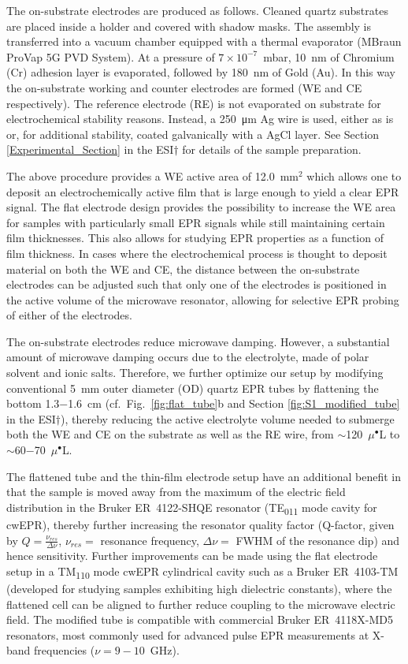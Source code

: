 \par
The on-substrate electrodes are produced as follows. Cleaned quartz substrates are placed inside a holder and covered with shadow masks. The assembly is transferred into a vacuum chamber equipped with a thermal evaporator (MBraun ProVap 5G PVD System). At a pressure of $7\times10^{-7}$~mbar, 10~nm of Chromium (Cr) adhesion layer is evaporated, followed by 180~nm of Gold (Au). In this way the on-substrate working and counter electrodes are formed (WE and CE respectively). The reference electrode (RE) is not evaporated on substrate for electrochemical stability reasons. Instead, a \SI{250}{\micro\meter} Ag wire is used, either as is or, for additional stability, coated galvanically with a AgCl layer.\cite{Safari2011} See Section \ref{Experimental_Section} in the ESI$\dag$ for details of the sample preparation.
\par
The above procedure provides a WE active area of 12.0~mm$^2$ which allows one to deposit an electrochemically active film that is large enough to yield a clear EPR signal. The flat electrode design provides the possibility to increase the WE area for samples with particularly small EPR signals while still maintaining certain film thicknesses. This also allows for studying EPR properties as a function of film thickness. In cases where the electrochemical process is thought to deposit material on both the WE and CE, the distance between the on-substrate electrodes can be adjusted such that only one of the electrodes is positioned in the active volume of the microwave resonator, allowing for selective EPR probing of either of the electrodes.
\par
The on-substrate electrodes reduce microwave damping. However, a substantial amount of microwave damping occurs due to the electrolyte, made of polar solvent and ionic salts. Therefore, we further optimize our setup by modifying conventional 5~mm outer diameter (OD) quartz EPR tubes by flattening the bottom 1.3$-$1.6~cm (cf.\ Fig.~\ref{fig:flat_tube}b and Section \ref{fig:S1_modified_tube} in the ESI$\dag$), thereby reducing the active electrolyte volume needed to submerge both the WE and CE on the substrate as well as the RE wire, from $\sim$120~$\mu^{\bullet}$L to $\sim$60$-$70~$\mu^{\bullet}$L.
\par
The flattened tube and the thin-film electrode setup have an additional benefit in that the sample is moved away from the maximum of the electric field distribution in the Bruker ER~4122-SHQE resonator (TE\textsubscript{011} mode cavity for cwEPR), thereby further increasing the resonator quality factor (Q-factor, given by $Q = \frac{\nu_{res}}{\Delta \nu}$, $\nu_{res} =$ resonance frequency, $\Delta \nu =$ FWHM of the resonance dip) and hence sensitivity. Further improvements can be made using the flat electrode setup in a TM\textsubscript{110} mode cwEPR cylindrical cavity such as a Bruker ER~4103-TM (developed for studying samples exhibiting high dielectric constants), where the flattened cell can be aligned to further reduce coupling to the microwave electric field. The modified tube is compatible with commercial Bruker ER~4118X-MD5 resonators, most commonly used for advanced pulse EPR measurements at X-band frequencies ($\nu = 9-10$~GHz).


